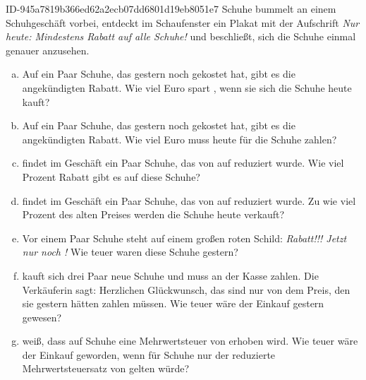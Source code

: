 \begin{exercise}
      {ID-945a7819b366ed62a2ecb07dd6801d19eb8051e7}
      {Schuhe}
  \ifproblem\problem
    \xxa{} bummelt an einem Schuhgeschäft vorbei, entdeckt im Schaufenster ein
    Plakat mit der Aufschrift {\itshape\glqq Nur heute: Mindestens  Rabatt
    auf alle Schuhe!\grqq} und beschließt, sich die Schuhe einmal genauer anzusehen.
    \begin{enumerate}[a)]
      \item Auf ein Paar Schuhe, das gestern noch  gekostet hat, gibt es
            die angekündigten  Rabatt. Wie viel Euro spart \xxa, wenn sie
            sich die Schuhe heute kauft?
      \item Auf ein Paar Schuhe, das gestern noch  gekostet hat, gibt es
            die angekündigten  Rabatt. Wie viel Euro muss \xxa{} heute
            für die Schuhe zahlen?
      \item \xxa{} findet im Geschäft ein Paar Schuhe, das von  auf
             reduziert wurde. Wie viel Prozent Rabatt gibt es auf
            diese Schuhe?
      \item \xxa{} findet im Geschäft ein Paar Schuhe, das von  auf
             reduziert wurde. Zu wie viel Prozent des alten
            Preises werden die Schuhe heute verkauft?
      \item Vor einem Paar Schuhe steht auf einem großen roten Schild:
            {\itshape\glqq {} Rabatt!!! Jetzt nur noch !\grqq}
            Wie teuer waren diese Schuhe gestern?
      \item \xxa{} kauft sich drei Paar neue Schuhe und muss an der Kasse
             zahlen. Die Verkäuferin sagt: \glqq Herzlichen
            Glückwunsch, das sind nur  von dem Preis, den sie gestern
            hätten zahlen müssen.\grqq{}
            Wie teuer wäre der Einkauf gestern gewesen?
      \item \xxa{} weiß, dass auf Schuhe eine Mehrwertsteuer von  erhoben
            wird. Wie teuer wäre der Einkauf geworden, wenn für Schuhe nur der
            reduzierte Mehrwertsteuersatz von  gelten würde?
    \end{enumerate}
  \fi
\end{exercise}
